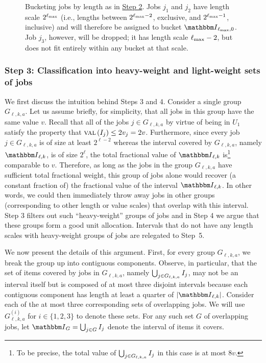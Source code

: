 \begin{figure}
    \caption{\small{Bucketing jobs by length as in \hyperref[sec:bucketing]{Step 2}.
    Jobs $j_1$ and $j_2$ have length scale $2^\lmax$ (i.e., lengths between
    $2^{\lmax-2}$, exclusive, and $2^{\lmax-1}$, inclusive) and will therefore
    be assigned to bucket $\Int_{\lmax,0}$. Job $j_3$, however, will be
    dropped; it has length scale $\lmax-2$, but does not fit entirely within
    any bucket at that scale.}}
    \label{fig:bucketing}
\end{figure}

\subsubsection*{Step 3: Classification into heavy-weight and light-weight sets of jobs}

We first discuss the intuition behind Steps 3 and 4. Consider a single
group $G_{\ell,k,a}$. Let us assume briefly, for simplicity, that all
jobs in this group have the same value $v$. Recall that all of the
jobs $j\in G_{\ell,k,a}$ by virtue of being in $U_1$ satisfy the
property that $\fvI[\intj]\le 2\valj=2v$. Furthermore, since every job
$j\in G_{\ell,k,a}$ is of size at least $2^{\ell-2}$ whereas the
interval covered by $G_{\ell,k,a}$, namely $\Int_{\ell,k}$, is of size
$2^\ell$, the total fractional value of $\Int_{\ell,k}$ is\footnote{To
  be precise, the total value of $\Union_{j\in G_{\ell,k,a}} \intj$ in
  this case is at most $8v$.} comparable to $v$.  Therefore, as long
as the jobs in the group $G_{\ell,k,a}$ have sufficient total
fractional weight, this group of jobs alone would recover (a constant
fraction of) the fractional value of the interval $\Int_{\ell,k}$. In
other words, we could then immediately throw away jobs in other groups
(corresponding to other length or value scales) that overlap with this
interval. Step 3 filters out such ``heavy-weight'' groups of jobs and
in Step 4 we argue that these groups form a good unit
allocation. Intervals that do not have any length scales with
heavy-weight groups of jobs are relegated to Step~5.

We now present the details of this argument. First, for every group
$G_{\ell,k,a}$, we break the group up into contiguous
components. Observe, in particular, that the set of items covered by
jobs in $G_{\ell,k,a}$, namely $\Union_{j\in G_{\ell,k,a}} \intj$, may
not be an interval itself but is composed of at most three disjoint
intervals because each contiguous component has length at least a
quarter of $|\Int_{\ell,k}|$. Consider each of the at most three
corresponding sets of overlapping jobs. We will use
$G_{\ell,k,a}^{(i)}$ for $i\in \{1,2,3\}$ to denote these sets. For
any such set $G$ of overlapping jobs, let
$\Int_G = \Union_{j\in G} \intj$ denote the interval of items it
covers.

